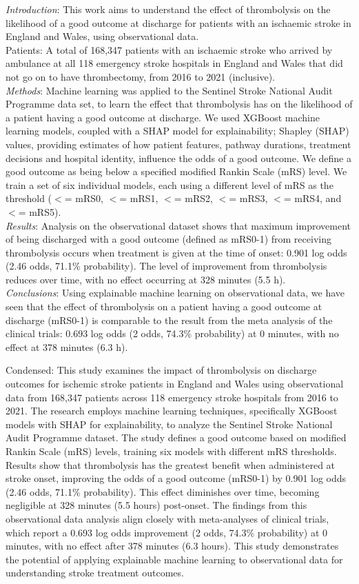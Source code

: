 \textit{Introduction}:
This work aims to understand the effect of thrombolysis on the likelihood of a good outcome at discharge for patients with an ischaemic stroke in England and Wales, using observational data.\\
Patients:
A total of 168,347 patients with an ischaemic stroke who arrived by ambulance at all 118 emergency stroke hospitals in England and Wales that did not go on to have thrombectomy, from 2016 to 2021 (inclusive).\\
\textit{Methods}:
Machine learning was applied to the Sentinel Stroke National Audit Programme data set, to learn the effect that thrombolysis has on the likelihood of a patient having a good outcome at discharge. We used XGBoost machine learning models, coupled with a SHAP model for explainability; Shapley (SHAP) values, providing estimates of how patient features, pathway durations, treatment decisions and hospital identity, influence the odds of a good outcome. We define a good outcome as being below a specified modified Rankin Scale (mRS) level. We train a set of six individual models, each using a different level of mRS as the threshold ($<$= mRS0, $<$= mRS1, $<$= mRS2, $<$= mRS3, $<$= mRS4, and $<$= mRS5).\\
\textit{Results}:
Analysis on the observational dataset shows that maximum improvement of being discharged with a good outcome (defined as mRS0-1) from receiving thrombolysis occurs when treatment is given at the time of onset: 0.901 log odds (2.46 odds, 71.1\% probability). The level of improvement from thrombolysis reduces over time, with no effect occurring at 328 minutes (5.5 h).\\
\textit{Conclusions}:
Using explainable machine learning on observational data, we have seen that the effect of thrombolysis on a patient having a good outcome at discharge (mRS0-1) is comparable to the result from the meta analysis of the clinical trials: 0.693 log odds (2 odds, 74.3\% probability) at 0 minutes, with no effect at 378 minutes (6.3 h).

Condensed:
This study examines the impact of thrombolysis on discharge outcomes for ischemic stroke patients in England and Wales using observational data from 168,347 patients across 118 emergency stroke hospitals from 2016 to 2021. The research employs machine learning techniques, specifically XGBoost models with SHAP for explainability, to analyze the Sentinel Stroke National Audit Programme dataset.
The study defines a good outcome based on modified Rankin Scale (mRS) levels, training six models with different mRS thresholds. Results show that thrombolysis has the greatest benefit when administered at stroke onset, improving the odds of a good outcome (mRS0-1) by 0.901 log odds (2.46 odds, 71.1\% probability). This effect diminishes over time, becoming negligible at 328 minutes (5.5 hours) post-onset.
The findings from this observational data analysis align closely with meta-analyses of clinical trials, which report a 0.693 log odds improvement (2 odds, 74.3\% probability) at 0 minutes, with no effect after 378 minutes (6.3 hours). This study demonstrates the potential of applying explainable machine learning to observational data for understanding stroke treatment outcomes.




